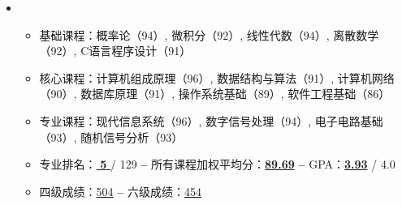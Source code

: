 \renewcommand{\ULthickness}{1pt}                  %
  \begin{itemize}[leftmargin=*]

    \item
      {\small
      \begin{itemize}
         \item{基础课程：概率论（94）, 微积分（92）, 线性代数（94）, 离散数学（92）, C语言程序设计（91）}
         \item{核心课程：计算机组成原理（96）, 数据结构与算法（91）, 计算机网络（90）, 数据库原理（91）, 操作系统基础（89）, 软件工程基础（86）}
         \item{专业课程：现代信息系统（96）, 数字信号处理（94）, 电子电路基础（93）, 随机信号分析（93）}
         
        \item{专业排名：\uline{\textbf{ 5 }} / 129 \hspace*{1cm} {\bfseries -- }所有课程加权平均分：\uline{\textbf{89.69}} \hspace*{1cm} {\bfseries -- }GPA：\uline{\textbf{3.93}} / 4.0}
        \item{四级成绩：\underline{504}\hspace*{2cm} {\bfseries -- }六级成绩：\underline{454}}

      \end{itemize}
      }
  \end{itemize}